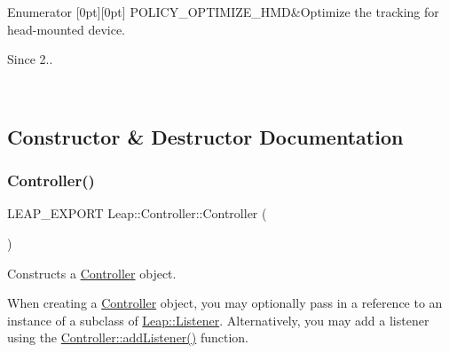 \begin{DoxyEnumFields}{Enumerator}
[0pt][0pt]{}\mbox{\label{class_leap_1_1_controller_a0bdb49fa94aa2da8b098c1ac296528d6a5688b86ae42d6f2a6e4770b8ce7466b7}} 
P\+O\+L\+I\+C\+Y\+\_\+\+O\+P\+T\+I\+M\+I\+Z\+E\+\_\+\+H\+MD&Optimize the tracking for head-\/mounted device. \begin{DoxySince}{Since}
2.. 
\end{DoxySince}
\\
\hline

\end{DoxyEnumFields}


\subsection{Constructor \& Destructor Documentation}
\mbox{\label{class_leap_1_1_controller_af5867527cc80ad805597a285eaf3d406}} 
\subsubsection{\texorpdfstring{Controller()}{Controller()}\hspace{0.1cm}{\footnotesize\ttfamily [1/2]}}
{\footnotesize\ttfamily L\+E\+A\+P\+\_\+\+E\+X\+P\+O\+RT Leap\+::\+Controller\+::\+Controller (\begin{DoxyParamCaption}{ }\end{DoxyParamCaption})}

Constructs a \hyperlink{class_leap_1_1_controller}{Controller} object.

When creating a \hyperlink{class_leap_1_1_controller}{Controller} object, you may optionally pass in a reference to an instance of a subclass of \hyperlink{class_leap_1_1_listener}{Leap\+::\+Listener}. Alternatively, you may add a listener using the \hyperlink{class_leap_1_1_controller_a9b6318221593be63a0385748ca66974f}{Controller\+::add\+Listener()} function.

